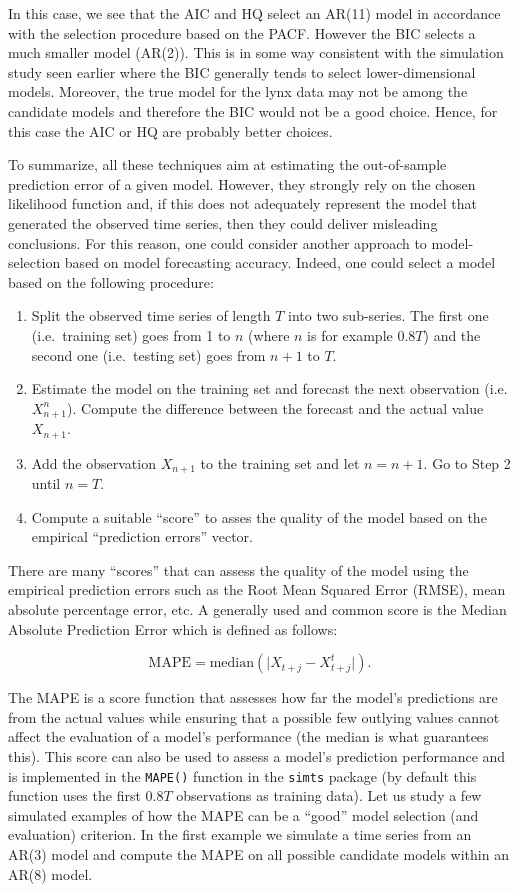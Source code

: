 \documentclass[]{book}
\providecommand{\tightlist}{%
  \setlength{\itemsep}{0pt}\setlength{\parskip}{0pt}}
\theoremstyle{definition}
\theoremstyle{definition}
\theoremstyle{definition}
\theoremstyle{remark}
\begin{document}
In this case, we see that the AIC and HQ select an AR(11) model in
accordance with the selection procedure based on the PACF. However the
BIC selects a much smaller model (AR(2)). This is in some way consistent
with the simulation study seen earlier where the BIC generally tends to
select lower-dimensional models. Moreover, the true model for the lynx
data may not be among the candidate models and therefore the BIC would
not be a good choice. Hence, for this case the AIC or HQ are probably
better choices.

To summarize, all these techniques aim at estimating the out-of-sample
prediction error of a given model. However, they strongly rely on the
chosen likelihood function and, if this does not adequately represent
the model that generated the observed time series, then they could
deliver misleading conclusions. For this reason, one could consider
another approach to model-selection based on model forecasting accuracy.
Indeed, one could select a model based on the following procedure:

\begin{enumerate}
\def\labelenumi{\arabic{enumi}.}
\tightlist
\item
  Split the observed time series of length \(T\) into two sub-series.
  The first one (i.e.~training set) goes from 1 to \(n\) (where \(n\) is
  for example \(0.8T\)) and the second one (i.e.~testing set) goes from
  \(n + 1\) to \(T.\)
\item
  Estimate the model on the training set and forecast the next
  observation (i.e. \(X_{n+1}^n\)). Compute the difference between the
  forecast and the actual value \(X_{n+1}\).
\item
  Add the observation \(X_{n+1}\) to the training set and let
  \(n = n + 1\). Go to Step 2 until \(n = T\).
\item
  Compute a suitable ``score'' to asses the quality of the model based
  on the empirical ``prediction errors'' vector.
\end{enumerate}

There are many ``scores'' that can assess the quality of the model using
the empirical prediction errors such as the Root Mean Squared Error
(RMSE), mean absolute percentage error, etc. A generally used and common
score is the Median Absolute Prediction Error which is defined as
follows:

\[\text{MAPE} = \text{median}\left(\Big|X_{t+j} - X_{t+j}^t\Big|\right).\]

The MAPE is a score function that assesses how far the model's
predictions are from the actual values while ensuring that a possible
few outlying values cannot affect the evaluation of a model's
performance (the median is what guarantees this). This score can also be
used to assess a model's prediction performance and is implemented in
the \texttt{MAPE()} function in the \texttt{simts} package (by default
this function uses the first \(0.8T\) observations as training data).
Let us study a few simulated examples of how the MAPE can be a ``good''
model selection (and evaluation) criterion. In the first example we
simulate a time series from an AR(3) model and compute the MAPE on all
possible candidate models within an AR(8) model.
\end{document}
